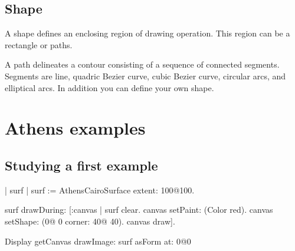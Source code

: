 \documentclass[a4paper,10pt,twoside]{book}
\begin{document}
\subsection{Shape}
A shape defines an enclosing region of drawing operation. This region can be a 
rectangle or paths. 

A path delineates a contour consisting of a sequence of connected segments. Segments
are line, quadric Bezier curve, cubic Bezier curve, circular arcs, and elliptical arcs. In addition you can define your own shape.

\section{Athens examples}

\subsection{Studying a first example}

\begin{code}{}
| surf |
surf :=  AthensCairoSurface extent: 100@100.
	
surf drawDuring: [:canvas |
		surf clear.
		canvas setPaint: (Color red).
		canvas setShape: (0@ 0 corner: 40@ 40).
		canvas draw].

Display getCanvas drawImage: surf asForm at: 0@0
\end{code}


\ifx\wholebook\relax\else
   
   
\end{document}
